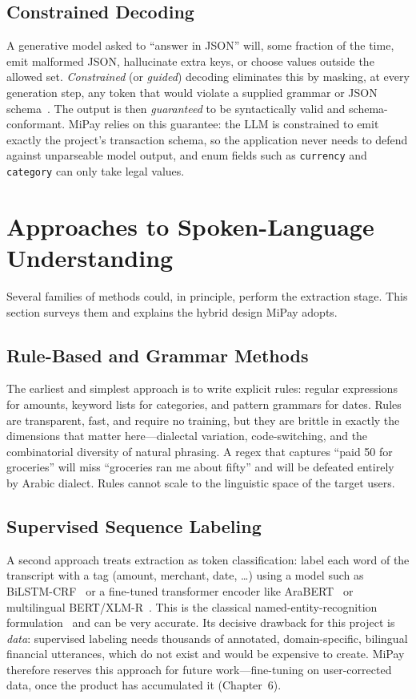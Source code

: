 \subsection{Constrained Decoding}

A generative model asked to ``answer in JSON'' will, some fraction of the time,
emit malformed JSON, hallucinate extra keys, or choose values outside the allowed
set. \emph{Constrained} (or \emph{guided}) decoding eliminates this by masking,
at every generation step, any token that would violate a supplied grammar or JSON
schema~\cite{willard2023outlines,geng2023grammar}. The output is then
\emph{guaranteed} to be syntactically valid and schema-conformant. MiPay relies
on this guarantee: the LLM is constrained to emit exactly the project's
transaction schema, so the application never needs to defend against unparseable
model output, and enum fields such as \texttt{currency} and \texttt{category} can
only take legal values.

\section{Approaches to Spoken-Language Understanding}

Several families of methods could, in principle, perform the extraction stage.
This section surveys them and explains the hybrid design MiPay adopts.

\subsection{Rule-Based and Grammar Methods}

The earliest and simplest approach is to write explicit rules: regular
expressions for amounts, keyword lists for categories, and pattern grammars for
dates. Rules are transparent, fast, and require no training, but they are brittle
in exactly the dimensions that matter here---dialectal variation, code-switching,
and the combinatorial diversity of natural phrasing. A regex that captures
``paid 50 for groceries'' will miss ``groceries ran me about fifty'' and will be
defeated entirely by Arabic dialect. Rules cannot scale to the linguistic space
of the target users.

\subsection{Supervised Sequence Labeling}

A second approach treats extraction as token classification: label each word of
the transcript with a tag (amount, merchant, date, \dots) using a model such as
BiLSTM-CRF~\cite{lample2016ner} or a fine-tuned transformer encoder like
AraBERT~\cite{antoun2020arabert} or multilingual
BERT/XLM-R~\cite{devlin2019bert,conneau2020xlmr}. This is the classical
named-entity-recognition formulation~\cite{li2022ner} and can be very accurate.
Its decisive drawback for this project is \emph{data}: supervised labeling needs
thousands of annotated, domain-specific, bilingual financial utterances, which do
not exist and would be expensive to create. MiPay therefore reserves this
approach for future work---fine-tuning on user-corrected data, once the product
has accumulated it (Chapter~6).

